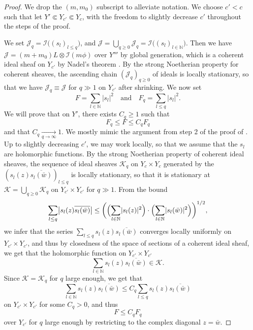 \documentclass[JEP,XML,SOM,Unicode,published]{cedram}
\theoremstyle{definition}
\newcommand \N{\mathbb N}
\begin{document}
\begin{proof}
We drop the $(m, m_0)$ subscript to alleviate notation. We choose $c' < c$ such that let $Y' \Subset Y_{c'} \Subset Y_c$, with the freedom to slightly decrease $c'$ throughout the steps of the proof.

We set $\mathscr{J}_q = \mathscr{I}\bigl((s_l)_{l \le q}\bigr)$, and $\mathscr{J} = \bigcup_{q \ge 0} \mathscr{J}_q = \mathscr{I}\bigl((s_l)_{l \in \N}\bigr)$. Then we have $\mathscr{J}=(m+m_0)L\otimes \mathscr{I}(m\phi)$ over $Y'''$ by global generation, which is a coherent ideal sheaf on $Y_{c'}$ by Nadel's theorem \cite{Nad}. By the strong Noetherian property for coherent sheaves, the ascending chain $(\mathscr{J}_q)_{q \ge 0}$ of ideals is locally stationary, so that we have $\mathscr{J}_q \equiv \mathscr{J}$ for $q \gg1$ on $Y_{c'}$ after shrinking.
We now set\vspace*{-3pt}
\[
F = \sum_{l \in \N} \lvert s_l \rvert^2
\quad\text{and}\quad
F_q =\sum_{l \le q} \lvert s_l \rvert^2.
\]
We will prove that on $Y'$, there exists $C_q \ge 1$ such that\vspace*{-3pt}
\[
F_q \le F \le C_q F_q
\]
and that $C_q \xrightarrow[q \to \infty]{} 1$. We mostly mimic the argument from step 2 of the proof of \cite[Th.\,2.2.1]{DPS}. Up to slightly decreasing $c'$, we may work locally, so that we assume that the $s_l$ are holomorphic functions. By the strong Noetherian property of coherent ideal sheaves, the sequence of ideal sheaves $\mathscr{K}_q$ on $Y_c \times Y_c$ generated by the $(s_l(z)\overline{s_l(\bar{w})})_{l \le q}$ is locally stationary, so that it is stationary at $\mathscr{K} = \bigcup_{q \ge 0} \mathscr{K}_q$ on $Y_{c'} \times Y_{c'}$ for $q \gg1$. From the bound\vspace*{-3pt}
\[
\sum_{l \le q} \bigl\lvert s_l(z)\overline{s_l(\bar{w})} \bigr\rvert \le \biggl(\Bigl(\sum_{l \in \N} \lvert s_l(z) \rvert^2\Bigr) \cdot \Bigl(\sum_{l \in \N} \lvert s_l(\bar{w}) \rvert^2\Bigr) \biggr)^{1/2},
\]
we infer that the series $\sum_{l \le q} s_l(z)\overline{s_l(\bar{w})}$ converges locally uniformly on $Y_{c'} \times Y_{c'}$, and thus by closedness of the space of sections of a coherent ideal sheaf, we get that the holomorphic function on $Y_{c'} \times Y_{c'}$\vspace*{-3pt}
\[
\sum_{l \in \N} s_l(z)\overline{s_l(\bar{w})} \in \mathscr{K}.
\]
Since $\mathscr{K} = \mathscr{K}_q$ for $q$ large enough, we get that
\[
\sum_{l \in \N} s_l(z)\overline{s_l(\bar{w})} \le C_q \sum_{l \le q} s_l(z)\overline{s_l(\bar{w})}
\]
on $Y_{c'} \times Y_{c'}$ for some $C_q >0$, and thus\vspace*{-3pt}
\[
F \le C_q F_q
\]
over $Y_{c'}$ for $q$ large enough by restricting to the complex diagonal $z= \bar{w}$.


\end{proof}
\end{document}
